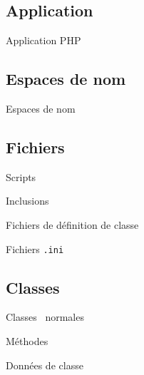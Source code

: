 \documentclass{beamer}
\begin{document}
\subsection{Application}

\begin{frame}{Application PHP}

\end{frame}

\subsection{Espaces de nom}

\begin{frame}{Espaces de nom}

\end{frame}

\subsection{Fichiers}

\begin{frame}{Scripts}

\end{frame}

\begin{frame}{Inclusions}

\end{frame}

\begin{frame}{Fichiers de définition de classe}

\end{frame}

\begin{frame}{Fichiers \texttt{.ini}}

\end{frame}

\subsection{Classes}

\begin{frame}{Classes \guillemotleft~normales~\guillemotright}

\end{frame}

\begin{frame}{Méthodes}

\end{frame}

\begin{frame}{Données de classe}

\end{frame}
\end{document}
